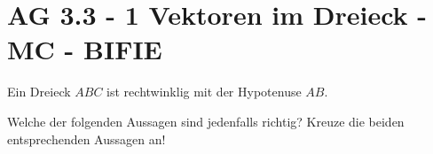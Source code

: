 \section{AG 3.3 - 1 Vektoren im Dreieck - MC - BIFIE}

\begin{beispiel}[AG 3.3]{1} %
		Ein Dreieck $ABC$ ist rechtwinklig mit der Hypotenuse $AB$.
	
	Welche der folgenden Aussagen sind jedenfalls richtig? Kreuze die beiden entsprechenden Aussagen an!
\end{beispiel}